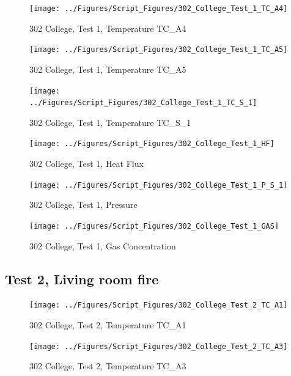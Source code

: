 \documentclass[12pt,oneside]{book}
\begin{document}
\begin{figure}[!ht]
\texttt{[image: ../Figures/Script\_Figures/302\_College\_Test\_1\_TC\_A4]}
\caption{302 College, Test 1, Temperature TC\_A4}
\label{fig:302_College_Test_1_TC_A4}
\end{figure}

\begin{figure}[!ht]
\texttt{[image: ../Figures/Script\_Figures/302\_College\_Test\_1\_TC\_A5]}
\caption{302 College, Test 1, Temperature TC\_A5}
\label{fig:302_College_Test_1_TC_A5}
\end{figure}

\begin{figure}[!ht]
\texttt{[image: ../Figures/Script\_Figures/302\_College\_Test\_1\_TC\_S\_1]}
\caption{302 College, Test 1, Temperature TC\_S\_1}
\label{fig:302_College_Test_1_TC_S_1}
\end{figure}

\begin{figure}[!ht]
\texttt{[image: ../Figures/Script\_Figures/302\_College\_Test\_1\_HF]}
\caption{302 College, Test 1, Heat Flux}
\label{fig:302_College_Test_1_HF}
\end{figure}

\begin{figure}[!ht]
\texttt{[image: ../Figures/Script\_Figures/302\_College\_Test\_1\_P\_S\_1]}
\caption{302 College, Test 1, Pressure}
\label{fig:302_College_Test_1_P_S_1}
\end{figure}

\begin{figure}[!ht]
\texttt{[image: ../Figures/Script\_Figures/302\_College\_Test\_1\_GAS]}
\caption{302 College, Test 1, Gas Concentration}
\label{fig:302_College_Test_1_GAS}
\end{figure}


\clearpage


\subsection{Test 2, Living room fire}

\begin{figure}[!ht]
\texttt{[image: ../Figures/Script\_Figures/302\_College\_Test\_2\_TC\_A1]}
\caption{302 College, Test 2, Temperature TC\_A1}
\label{fig:302_College_Test_2_TC_A1}
\end{figure}

\begin{figure}[!ht]
\texttt{[image: ../Figures/Script\_Figures/302\_College\_Test\_2\_TC\_A3]}
\caption{302 College, Test 2, Temperature TC\_A3}
\label{fig:302_College_Test_2_TC_A3}
\end{figure}
\end{document}
